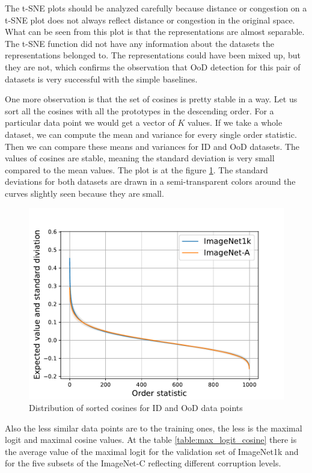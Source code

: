 \documentclass{article}
\begin{document}
The t-SNE plots should be analyzed carefully because distance or congestion on a t-SNE plot does not always reflect distance or congestion in the original space.
What can be seen from this plot is that the representations are almost separable.
The t-SNE function did not have any information about the datasets the representations belonged to.
The representations could have been mixed up, but they are not, which confirms the observation that OoD detection for this pair of datasets is very successful with the simple baselines.

One more observation is that the set of cosines is pretty stable in a way.
Let us sort all the cosines with all the prototypes in the descending order.
For a particular data point we would get a vector of $K$ values.
If we take a whole dataset, we can compute the mean and variance for every single order statistic.
Then we can compare these means and variances for ID and OoD datasets.
The values of cosines are stable, meaning the standard deviation is very small compared to the mean values.
The plot is at the figure \ref{fig:cosines_1k_A}.
The standard deviations for both datasets are drawn in a semi-transparent colors around the curves slightly seen because they are small.

\begin{figure}[H]
\caption{Distribution of sorted cosines for ID and OoD data points}
\label{fig:cosines_1k_A}
\centering
\includegraphics[scale=0.5]{cosines_sorted_mean_ImageNet1k-A.pdf}
\end{figure}

Also the less similar data points are to the training ones, the less is the maximal logit and maximal cosine values.
At the table \ref{table:max_logit_cosine} there is the average value of the maximal logit for the validation set of ImageNet1k and for the five subsets of the ImageNet-C reflecting different corruption levels.
\end{document}
